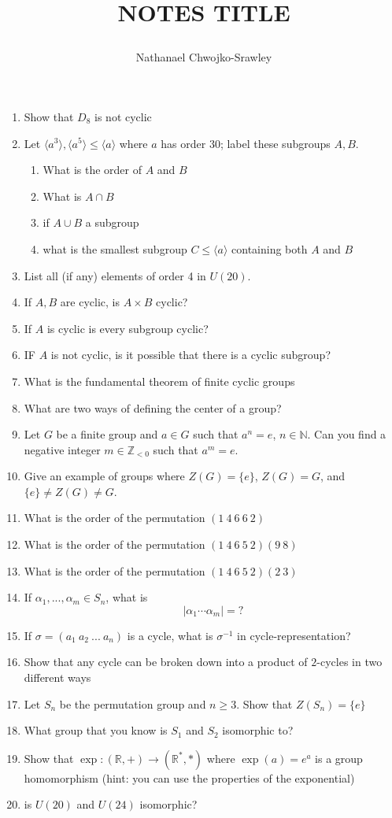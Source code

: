 \documentclass{book}
\title{
	\begin{huge}
		\bf{NOTES TITLE}
	\end{huge}
	}
\author{Nathanael Chwojko-Srawley}
\newcommand{\N}{{\mathbb{N}}}
\newcommand{\R}{{\mathbb{R}}}
\newcommand{\Z}{{\mathbb{Z}}}
\newcommand{\subg}{\leqslant}
\begin{document}
\begin{enumerate}
  \item Show that $D_8$ is not cyclic
  \item Let $\langle a^3 \rangle, \langle a^5 \rangle \subg \langle a \rangle$ where $a$ has order $30$; label
    these subgroups $A,B$.
    \begin{enumerate}
     \item What is the order of $A$ and $B$
      \item What is $A\cap B$
      \item if $A\cup B$ a subgroup
      \item what is the smallest subgroup $C \subg \langle a \rangle$ containing both $A$ and $B$
    \end{enumerate}
   \item List all (if any) elements of order 4 in $U(20)$.
   \item If $A,B$ are cyclic, is $A\times B$ cyclic?
   \item If $A$ is cyclic is every subgroup cyclic?
   \item IF $A$ is not cyclic, is it possible that there is a cyclic subgroup?
   \item What is the fundamental theorem of finite cyclic groups
   \item What are two ways of defining the center of a group?
   \item Let $G$ be a finite group and $a \in G$ such that $a^n = e$, $n \in \N$. Can you find a negative
      integer $m \in \Z_{<0}$ such that $a^m = e$.
   \item Give an example of groups where $Z(G) = \{e\}$, $Z(G) = G$, and $\{e\} \ne Z(G) \ne G$.
   \item What is the order of the permutation $(1\ 4\ 6\ 6\ 2)$
   \item What is the order of the permutation $(1\ 4\ 6\ 5\ 2)(9\ 8)$
   \item What is the order of the permutation $(1\ 4\ 6\ 5\ 2)(2\ 3)$
   \item If $\alpha_1, ..., \alpha_m \in S_n$, what is
     \[
      |\alpha_1\cdots \alpha_m| = ?
     \]
   \item If $\sigma = (a_1\ a_2\ ...\ a_n)$ is a cycle, what is $\sigma^{-1}$ in cycle-representation?
   \item Show that any cycle can be broken down into a product of $2$-cycles in two different ways
   \item Let $S_n$ be the permutation group and $n \ge 3$. Show that $Z(S_n) = \{e\}$
   \item What group that you know is $S_1$ and $S_2$ isomorphic to?
   \item Show that $\exp: (\R, +) \to (\R^*, *)$ where $\exp(a) = e^a$ is a group homomorphism (hint: you can
     use the properties of the exponential)
   \item is $U(20)$ and $U(24)$ isomorphic?
\end{enumerate}
\end{document}
